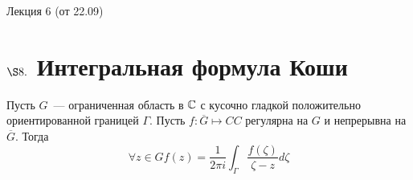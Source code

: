 \LARGE{Лекция 6 (от 22.09)}
\normalsize
\section{$\S 8.$ Интегральная формула Коши}
\theorem
Пусть $G$~--- ограниченная область в $\mathbb{C}$ с кусочно гладкой положительно
ориентированной границей $\Gamma$. Пусть $f: \overline{G} \mapsto CC$ регулярна
на $G$ и непрерывна на $\overline{G}$. Тогда
\begin{equation} \label{(8.1)}
    \forall z \in G f(z) = \frac{1}{2\pi i}\int_{\Gamma}\frac{f(\zeta)}{\zeta - z}d\zeta
\end{equation}

